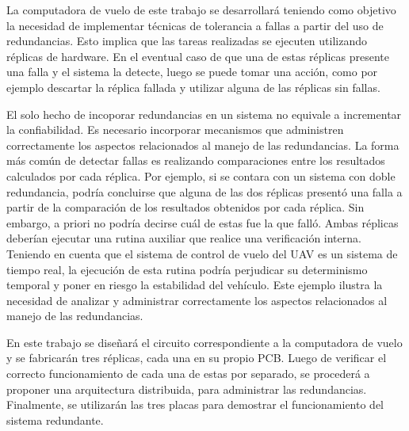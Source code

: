 La computadora de vuelo de este trabajo se desarrollará teniendo como objetivo la necesidad de implementar técnicas de tolerancia a fallas a partir del uso de redundancias. %
Esto implica que las tareas realizadas se ejecuten utilizando réplicas de hardware. En el eventual caso de que una de estas réplicas presente una falla y el sistema la detecte, luego se puede tomar una acción, como por ejemplo descartar la réplica fallada y utilizar alguna de las réplicas sin fallas. 

El solo hecho de incoporar redundancias en un sistema no equivale a incrementar la confiabilidad. Es necesario incorporar mecanismos que administren correctamente los aspectos relacionados al manejo de las redundancias. La forma más común de detectar fallas es realizando comparaciones entre los resultados calculados por cada réplica. Por ejemplo, si se contara con un sistema con doble redundancia, podría concluirse que alguna de las dos réplicas presentó una falla a partir de la comparación de los resultados obtenidos por cada réplica. Sin embargo, a priori no podría decirse cuál de estas fue la que falló. Ambas réplicas deberían ejecutar una rutina auxiliar que realice una verificación interna. Teniendo en cuenta que el sistema de control de vuelo del UAV es un sistema de tiempo real, la ejecución de esta rutina podría perjudicar su determinismo temporal y poner en riesgo la estabilidad del vehículo. Este ejemplo ilustra la necesidad de analizar y administrar correctamente los aspectos relacionados al manejo de las redundancias.

En este trabajo se diseñará el circuito correspondiente a la computadora de vuelo y se fabricarán tres réplicas, cada una en su propio PCB. Luego de verificar el correcto funcionamiento de cada una de estas por separado, se procederá a proponer una arquitectura distribuida, para administrar las redundancias. Finalmente, se utilizarán las tres placas para demostrar el funcionamiento del sistema redundante.



